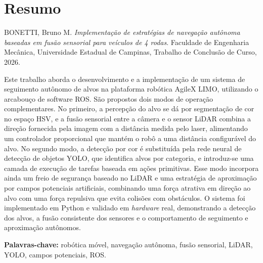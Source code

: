 \documentclass[11pt, a4paper]{article}
\begin{document}
\renewcommand{\contentsname}{Índice}
\tableofcontents
\newpage

\section*{Resumo}

\noindent BONETTI, Bruno M. \textit{Implementação de estratégias de navegação
autônoma baseadas em fusão sensorial para veículos de 4 rodas}. Faculdade de
Engenharia Mecânica, Universidade Estadual de Campinas, Trabalho de Conclusão de
Curso, 2026.

\vspace{0.5cm}

\noindent Este trabalho aborda o desenvolvimento e a implementação de um sistema
de seguimento autônomo de alvos na plataforma robótica AgileX LIMO, utilizando o
arcabouço de software ROS. São propostos dois modos de operação complementares. No
primeiro, a percepção do alvo se dá por segmentação de cor no espaço HSV, e a
fusão sensorial entre a câmera e o sensor LiDAR combina a direção fornecida pela
imagem com a distância medida pelo laser, alimentando um controlador proporcional
que mantém o robô a uma distância configurável do alvo. No segundo modo, a
detecção por cor é substituída pela rede neural de detecção de objetos YOLO, que
identifica alvos por categoria, e introduz-se uma camada de execução de tarefas
baseada em ações primitivas. Esse modo incorpora ainda um freio de segurança
baseado no LiDAR e uma estratégia de aproximação por campos potenciais artificiais,
combinando uma força atrativa em direção ao alvo com uma força repulsiva que evita
colisões com obstáculos. O sistema foi implementado em Python e validado em
\textit{hardware} real, demonstrando a detecção dos alvos, a fusão consistente dos
sensores e o comportamento de seguimento e aproximação autônomos.

\vspace{0.5cm}

\noindent \textbf{Palavras-chave:} robótica móvel, navegação autônoma, fusão
sensorial, LiDAR, YOLO, campos potenciais, ROS.

\newpage

\listoffigures
\newpage
\end{document}
